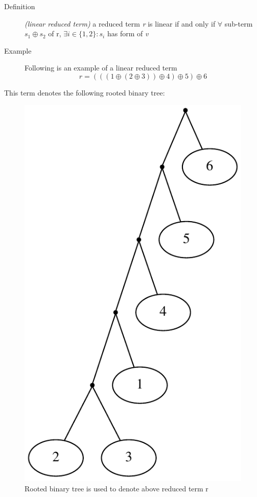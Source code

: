 \documentclass[a4paper, 12pt]{article}
\begin{document}
\begin{description}
\item [{Definition}] \textit {(linear reduced term)} a reduced term \textit {r} is linear if and only if $\forall$ sub-term $s_{1}\oplus s_{2}$ of r, $\exists i\in\{1,2\}:s_{i}$ has form of \textit {v} 
\item [{Example}] Following is an example of a linear reduced term 
\[
r=(((1\oplus(2\oplus3))\oplus4)\oplus5)\oplus6
\]
\end{description}
This term denotes the following rooted binary tree:\\
\begin{figure}[H]

\begin{centering}
\includegraphics[scale=0.5]{image/tree_by_r}
\caption{Rooted binary tree is used to denote above reduced term r}
\par\end{centering}

\end{figure}
\end{document}
